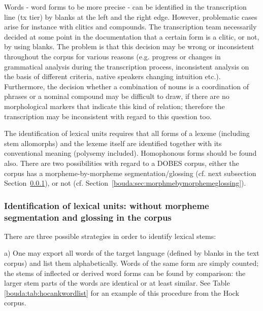 Words - word forms to be more precise - can be identified in the transcription line (tx tier) by blanks at the left and the right edge. However, problematic cases arise for instance with clitics and compounds. The transcription team necessarily decided at some point in the documentation that a certain form is a clitic, or not, by using blanks. The problem is that this decision may be wrong or inconsistent throughout the corpus for various reasons (e.g. progress or changes in grammatical analysis during the transcription process, inconsistent analysis on the basis of different criteria, native speakers changing intuition etc.). Furthermore, the decision whether a combination of nouns is a coordination of phrases or a nominal compound may be difficult to draw, if there are no morphological markers that indicate this kind of relation; therefore the transcription may be inconsistent with regard to this question too. 

The identification of lexical units requires that all forms of a lexeme (including stem allomorphs) and the lexeme itself are identified together with its conventional meaning (polysemy included). Homophonous forms should be found also. There are two possibilities with regard to a DOBES corpus, either the corpus has a morpheme-by-morpheme segmentation/glossing (cf. next subsection Section\ \ref{bouda:sec:identificationoflexicaluntiswomorpheme}), or not (cf. Section\ \ref{bouda:sec:morphmebymorphemeglossing}). 

\subsubsection{Identification of lexical units: without morpheme segmentation and glossing in the corpus}
\label{bouda:sec:identificationoflexicaluntiswomorpheme}

There are three possible strategies in order to identify lexical stems: 

a) One may export all words of the target language (defined by blanks in the text corpus) and list them alphabetically. Words of the same form are simply counted; the stems of inflected or derived word forms can be found by comparison: the larger stem parts of the words are identical or at least similar. See Table  \ref{bouda:tab:hocankwordlist} for an example of this procedure from the Hoc{\A}k corpus. 

